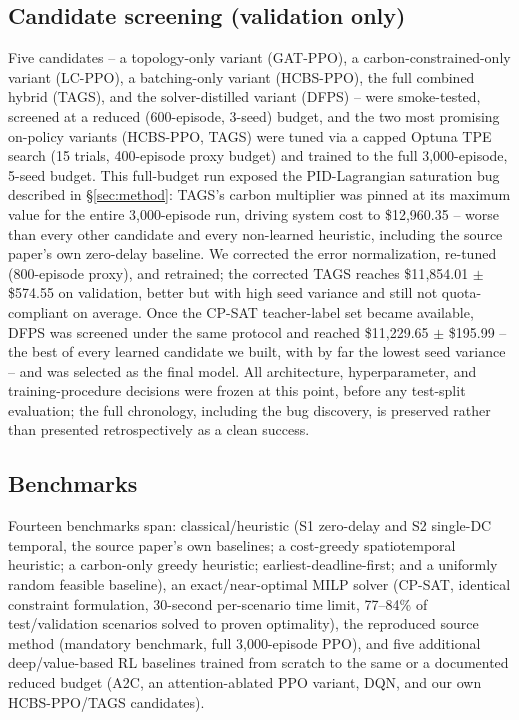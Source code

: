 \documentclass[journal]{IEEEtran}
\begin{document}
\subsection{Candidate screening (validation only)}
\label{sec:model_selection}
Five candidates -- a topology-only variant (GAT-PPO), a carbon-constrained-only variant (LC-PPO), a batching-only variant (HCBS-PPO), the full combined hybrid (TAGS), and the solver-distilled variant (DFPS) -- were smoke-tested, screened at a reduced (600-episode, 3-seed) budget, and the two most promising on-policy variants (HCBS-PPO, TAGS) were tuned via a capped Optuna TPE search (15 trials, 400-episode proxy budget) and trained to the full 3{,}000-episode, 5-seed budget. This full-budget run exposed the PID-Lagrangian saturation bug described in \S\ref{sec:method}: TAGS's carbon multiplier was pinned at its maximum value for the entire 3{,}000-episode run, driving system cost to \$12{,}960.35 -- worse than every other candidate and every non-learned heuristic, including the source paper's own zero-delay baseline. We corrected the error normalization, re-tuned (800-episode proxy), and retrained; the corrected TAGS reaches \$11{,}854.01 $\pm$ \$574.55 on validation, better but with high seed variance and still not quota-compliant on average. Once the CP-SAT teacher-label set became available, DFPS was screened under the same protocol and reached \$11{,}229.65 $\pm$ \$195.99 -- the best of every learned candidate we built, with by far the lowest seed variance -- and was selected as the final model. All architecture, hyperparameter, and training-procedure decisions were frozen at this point, before any test-split evaluation; the full chronology, including the bug discovery, is preserved rather than presented retrospectively as a clean success.

\subsection{Benchmarks}
Fourteen benchmarks span: classical/heuristic (S1 zero-delay and S2 single-DC temporal, the source paper's own baselines; a cost-greedy spatiotemporal heuristic; a carbon-only greedy heuristic; earliest-deadline-first; and a uniformly random feasible baseline), an exact/near-optimal MILP solver (CP-SAT, identical constraint formulation, 30-second per-scenario time limit, 77--84\% of test/validation scenarios solved to proven optimality), the reproduced source method (mandatory benchmark, full 3{,}000-episode PPO), and five additional deep/value-based RL baselines trained from scratch to the same or a documented reduced budget (A2C, an attention-ablated PPO variant, DQN, and our own HCBS-PPO/TAGS candidates).
\end{document}
